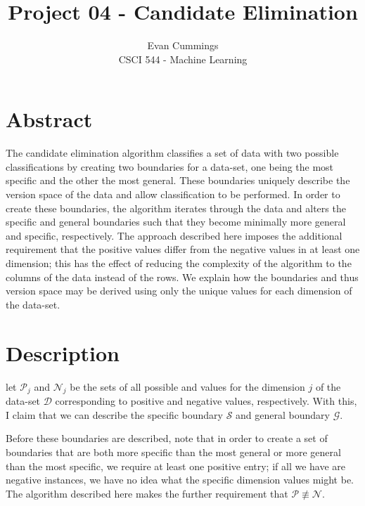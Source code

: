 
\DeclareMathOperator*{\argmax}{arg\,max}

\usepackage[top=.5in, bottom=.5in, left=.5in, right=.5in]{geometry}
\usepackage{natbib}


\small

\title{Project 04 - Candidate Elimination}
\author{Evan Cummings\\
CSCI 544 - Machine Learning}

\maketitle

\section*{Abstract}

The candidate elimination algorithm classifies a set of data with two possible classifications by creating two boundaries for a data-set, one being the most specific and the other the most general.  These boundaries uniquely describe the version space of the data and allow classification to be performed.  In order to create these boundaries, the algorithm iterates through the data and alters the specific and general boundaries such that they become minimally more general and specific, respectively.  The approach described here imposes the additional requirement that the positive values differ from the negative values in at least one dimension; this has the effect of reducing the complexity of the algorithm to the columns of the data instead of the rows.  We explain how the boundaries and thus version space may be derived using only the unique values for each dimension of the data-set.

\section*{Description}

let $\mathcal{P}_j$ and $\mathcal{N}_j$ be the sets of all possible and values for the dimension $j$ of the data-set $\mathcal{D}$ corresponding to positive and negative values, respectively.  With this, I claim that we can describe the specific boundary $\mathcal{S}$ and general boundary $\mathcal{G}$.

Before these boundaries are described, note that in order to create a set of boundaries that are both more specific than the most general or more general than the most specific, we require at least one positive entry; if all we have are negative instances, we have no idea what the specific dimension values might be.  The algorithm described here makes the further requirement that $\mathcal{P} \not\equiv \mathcal{N}$.

